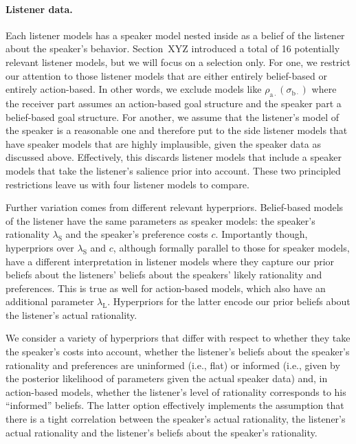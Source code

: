 \paragraph{Listener data.} Each listener models has a speaker model
nested inside as a belief of the listener about the speaker's
behavior. Section~XYZ  introduced a total of 16
potentially relevant listener models, but we will focus on a selection
only. For one, we restrict our attention to those listener models that
are either entirely belief-based or entirely action-based. In other
words, we exclude models like
$\rho_{\mathrm{a}\cdot}(\sigma_{\mathrm{b}\cdot})$ where the receiver
part assumes an action-based goal structure and the speaker part a
belief-based goal structure. For another, we assume that the
listener's model of the speaker is a reasonable one and therefore put
to the side listener models that have speaker models that are highly
implausible, given the speaker data as discussed above. Effectively,
this discards listener models that include a speaker models that take
the listener's salience prior into account. These two principled
restrictions leave us with four listener models to compare.

Further variation comes from different relevant
hyperpriors. Belief-based models of the listener have the same
parameters as speaker models: the speaker's rationality
$\lambda_\mathrm{S}$ and the speaker's preference costs
$c$. Importantly though, hyperpriors over $\lambda_\mathrm{S}$ and
$c$, although formally parallel to those for speaker models, have a
different interpretation in listener models where they capture our
prior beliefs about the listeners' beliefs about the speakers' likely
rationality and preferences. This is true as well for action-based
models, which also have an additional parameter
$\lambda_\mathrm{L}$. Hyperpriors for the latter encode our prior
beliefs about the listener's actual rationality.

We consider a variety of hyperpriors that differ with respect to
whether they take the speaker's costs into account, whether the
listener's beliefs about the speaker's rationality and preferences are
uninformed (i.e., flat) or informed (i.e., given by the posterior
likelihood of parameters given the actual speaker data) and, in
action-based models, whether the listener's level of rationality
corresponds to his ``informed'' beliefs. The latter option effectively
implements the assumption that there is a tight correlation between
the speaker's actual rationality, the listener's actual rationality
and the listener's beliefs about the speaker's rationality.

